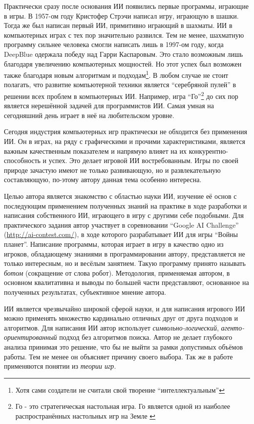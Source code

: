 \documentclass[12pt]{report}
\begin{document}
Практически сразу после основания ИИ появились первые программы, играющие в игры. В 1957-ом году Кристофер Стрэчи написал игру, играющую в шашки. Тогда же был написан первый ИИ, примитивно играющий в шахматы. \citep{russell1995} ИИ в компьютерных играх с тех пор значительно развился. Тем не менее, шахматную программу сильнее человека смогли написать лишь в 1997-ом году, когда DeepBlue одержала победу над Гарри Каспаровым. Это стало возможным лишь благодаря увеличению компьютерных мощностей. Но этот успех был возможен также благодаря новым алгоритмам и подходам\footnote{Хотя сами создатели не считали свой творение ``интеллектуальным''\cite{moravec1998will}}. В любом случае не стоит полагать, что развитие компьютерной техники является ``серебряной пулей'' в решении всех проблем в компьютерных ИИ. Например, игра ``Го''\footnote{Го - это стратегическая настольная игра. Го является одной из наиболее распространённых настольных игр на Земле \cite{GoGameWiki}} до сих пор является нерешённой задачей для программистов ИИ. Самая умная на сегодняшний день играет в неё на любительском уровне. \citep{russell1995}

Сегодня индустрия компьютерных игр практически не обходится без применения ИИ. Он в играх, на ряду с графическими и прочими характеристиками, является важным качественным показателем и напрямую влияет на их конкурентно-способность и успех. Это делает игровой ИИ востребованным. Игры по своей природе зачастую имеют не только развивающую, но и развлекательную составляющую, по-этому автору данная тема особенно интересна.

Целью автора является знакомство с областью науки ИИ, изучение её основ с последующим применением полученных знаний на практике в ходе разработки и написания собственного ИИ, играющего в игру с другими себе подобными. Для практического задания автор участвует в соревновании ``Google AI Challenge'' (\url{http://ai-contest.com/}), в ходе которого разрабатывает ИИ для игры ``Войны планет''. Написание программы, которая играет в игру в качество одно из игроков, обладающему знаниями в программировании автору, представляется не только интересным, но и весёлым занятием. Такую программу принято называть \emph{ботом} (сокращение от слова робот). Методология, применяемая автором, в основном квалитативна и выводы по большей части представляют, основанное на полученных результатах, субъективное мнение автора.

ИИ является чрезвычайно широкой сферой науки, и для написания игрового ИИ можно применять множество кардинально отличных друг от друга подходов и алгоритмов. Для написания ИИ автор использует \emph{символьно-логический}, \emph{агенто-ориентированный} подход без алгоритмов поиска. Автор не делает глубокого анализа принимая это решение, что бы не выйти за рамки допустимых объёмов работы. Тем не менее он объясняет причину своего выбора. Так же в работе применяются понятии из \emph{теории игр}.
\end{document}
